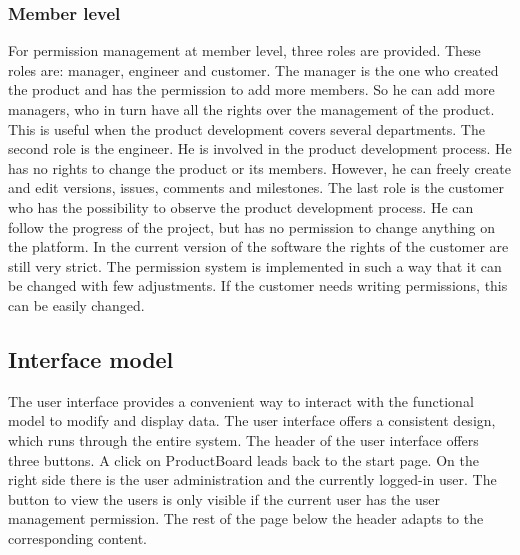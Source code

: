     \subsubsection*{Member level}
    For permission management at member level, three roles are provided. These roles are: manager, engineer and customer. The manager is the one who created the product and has the permission to add more members. So he can add more managers, who in turn have all the rights over the management of the product. This is useful when the product development covers several departments. The second role is the engineer. He is involved in the product development process. He has no rights to change the product or its members. However, he can freely create and edit versions, issues, comments and milestones. The last role is the customer who has the possibility to observe the product development process. He can follow the progress of the project, but has no permission to change anything on the platform. In the current version of the software the rights of the customer are still very strict. The permission system is implemented in such a way that it can be changed with few adjustments. If the customer needs writing permissions, this can be easily changed. 
    
    
    \subsection*{Interface model} 
    The user interface provides a convenient way to interact with the functional model to modify and display data. The user interface offers a consistent design, which runs through the entire system. The header of the user interface offers three buttons. A click on ProductBoard leads back to the start page. On the right side there is the user administration and the currently logged-in user. The button to view the users is only visible if the current user has the user management permission. The rest of the page below the header adapts to the corresponding content.

